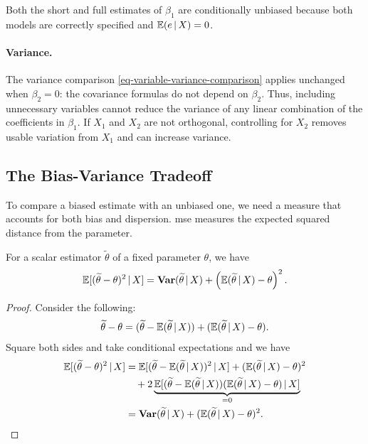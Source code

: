 \documentclass[a4paper,12pt]{article}
\begin{document}
Both the short and full estimates of $\beta_1$ are conditionally unbiased
because both models are correctly specified and $\operatorname{\mathbb{E}}(e\mathpunct{}|\mathpunct{} X)=0$.

\paragraph{Variance.}

The variance comparison \eqref{eq-variable-variance-comparison} applies unchanged when $\beta_2=0$:
the covariance formulas do not depend on $\beta_2$.
Thus, including unnecessary variables cannot reduce the variance of any linear combination of the coefficients in $\beta_1$.
If $X_1$ and $X_2$ are not orthogonal, controlling for $X_2$ removes usable variation from $X_1$ and can increase variance.

\subsection{The Bias-Variance Tradeoff}

To compare a biased estimate with an unbiased one, we need a measure that accounts for both bias and dispersion.
\Gls{mse} measures the expected squared distance from the parameter.

\begin{proposition}
	For a scalar estimator $\widetilde\theta$ of a fixed parameter $\theta$, we have
	\begin{align}
		\operatorname{\mathbb{E}}[(\widetilde\theta-\theta)^2\mathpunct{}|\mathpunct{} X]
		=\operatorname{\text{\textrm{\upshape\textbf{Var}}}}(\widetilde\theta\mathpunct{}|\mathpunct{} X)
		+\left(\operatorname{\mathbb{E}}(\widetilde\theta\mathpunct{}|\mathpunct{} X)-\theta\right)^2.
	\end{align}
\end{proposition}
\begin{proof}
	Consider the following:
	\begin{align}
		\widetilde\theta-\theta
		= (\widetilde\theta-\operatorname{\mathbb{E}}(\widetilde\theta\mathpunct{}|\mathpunct{} X))+(\operatorname{\mathbb{E}}(\widetilde\theta\mathpunct{}|\mathpunct{} X)-\theta).
	\end{align}
	Square both sides and take conditional expectations and we have
	\begin{align*}
		\operatorname{\mathbb{E}}[(\widetilde\theta-\theta)^2\mathpunct{}|\mathpunct{} X]
		&= \operatorname{\mathbb{E}}[(\widetilde\theta-\operatorname{\mathbb{E}}(\widetilde\theta\mathpunct{}|\mathpunct{} X))^2\mathpunct{}|\mathpunct{} X]
		+ (\operatorname{\mathbb{E}}(\widetilde\theta\mathpunct{}|\mathpunct{} X)-\theta)^2\\
		&\quad+ 2\underbrace{\operatorname{\mathbb{E}}[(\widetilde\theta-\operatorname{\mathbb{E}}(\widetilde\theta\mathpunct{}|\mathpunct{} X))(\operatorname{\mathbb{E}}(\widetilde\theta\mathpunct{}|\mathpunct{} X)-\theta)\mathpunct{}|\mathpunct{} X]}_{=0} \\
		&= \operatorname{\text{\textrm{\upshape\textbf{Var}}}}(\widetilde\theta\mathpunct{}|\mathpunct{} X)
		+ (\operatorname{\mathbb{E}}(\widetilde\theta\mathpunct{}|\mathpunct{} X)-\theta)^2.
		\qedhere
	\end{align*}
\end{proof}
\end{document}
